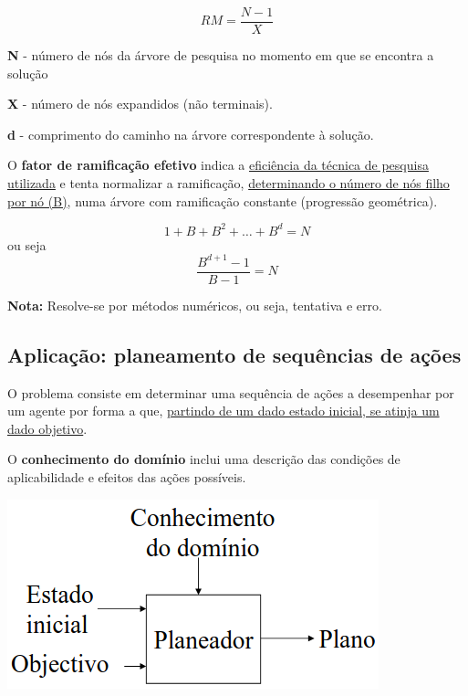 \documentclass{article}
\begin{document}
\[ RM = \frac{N - 1}{X} \]

\begin{flushleft}
  \textbf{N} - número de nós da árvore de pesquisa no momento em que se encontra a solução
  
  \textbf{X} - número de nós expandidos (não terminais).

  \textbf{d} - comprimento do caminho na árvore correspondente à solução.

\end{flushleft}

O \textbf{fator de ramificação efetivo} indica a \uline{eficiência da técnica de pesquisa utilizada} e tenta
normalizar a ramificação, \uline{determinando o número de nós filho por nó (B)}, numa árvore com
ramificação constante (progressão geométrica).

\[ 1 + B + B^2 + \dots + B^d = N \] ou seja \[ \frac{B^{d+1} - 1}{B - 1} = N \]

\begin{flushleft}
  \textbf{Nota:} Resolve-se por métodos numéricos, ou seja, tentativa e erro.
\end{flushleft}

\subsection{Aplicação: planeamento de
sequências de ações}

O problema consiste em determinar uma sequência de ações a
desempenhar por um agente por forma a que, \uline{partindo de um dado
estado inicial, se atinja um dado objetivo}.

O \textbf{conhecimento do domínio} inclui uma descrição das condições de
aplicabilidade e efeitos das ações possíveis.

\begin{center}
  \includegraphics[scale=0.35]{56}
\end{center}

\pagebreak
\end{document}
